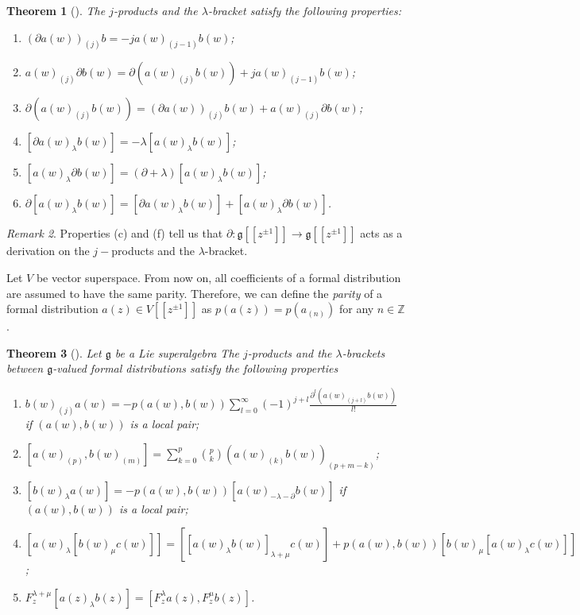 \documentclass[a4paper, 12pt, reqno]{amsart}
\newtheorem{theorem}{Theorem}[subsection]
\theoremstyle{remark}
\newtheorem{remark}[theorem]{Remark}
\numberwithin{equation}{subsection}
\begin{document}
\begin{theorem}[{\cite[Section 2.3]{nozaradan_introduction_2008}}]
  \label{thr:3}
  The $j$-products and the $\lambda$-bracket satisfy the following properties:
  \begin{enumerate}
  \item $(\partial a(w))_{(j)}b = -ja(w)_{(j - 1)}b(w)$;
  \item $a(w)_{(j)}\partial b(w) = \partial(a(w)_{(j)}b(w)) + ja(w)_{(j - 1)}b(w)$;
  \item $\partial(a(w)_{(j)}b(w))=(\partial a(w))_{(j)}b(w)+a(w)_{(j)}\partial b(w)$;
  \item $[\partial a(w)_{\lambda}b(w)] = -\lambda [a(w)_{\lambda}b(w)]$;
  \item $[a(w)_{\lambda}\partial b(w)] = (\partial + \lambda)[a(w)_{\lambda}b(w)]$;
  \item $\partial[a(w)_\lambda b(w)]=[\partial a(w)_\lambda b(w)]+[a(w)_\lambda \partial b(w)]$.
  \end{enumerate}
\end{theorem}
\begin{remark}
  \label{rmk:3}
  Properties (c) and (f) tell us that $\partial: \mathfrak{g}[[z^{\pm 1}]] \to \mathfrak{g}[[z^{\pm 1}]]$ acts as a derivation on the $j-$products and the $\lambda$-bracket.
\end{remark}

Let $V$ be vector superspace.
From now on, all coefficients of a formal distribution are assumed to have the same parity.
Therefore, we can define the \emph{parity} of a formal distribution $a(z) \in V[[z^{\pm 1}]]$ as $p(a(z)) = p(a_{(n)})$ for any $n \in \mathbb{Z}$.

\begin{theorem}[{\cite[Section 2.3]{nozaradan_introduction_2008}}]
  \label{thr:4}
  Let $\mathfrak{g}$ be a Lie superalgebra
  The $j$-products and the $\lambda$-brackets between $\mathfrak{g}$-valued formal distributions satisfy the following properties
  \begin{enumerate}
  \item $b(w)_{(j)}a(w) = -p(a(w), b(w))\sum_{l = 0}^{\infty}(-1)^{j + l}\frac{\partial^l(a(w)_{(j + l)}b(w))}{l!}$ if $(a(w), b(w))$ is a local pair;
  \item $[a(w)_{(p)}, b(w)_{(m)}] = \sum_{k = 0}^p\binom{p}{k}(a(w)_{(k)}b(w))_{(p + m - k)}$;
  \item $[b(w)_{\lambda}a(w)] = -p(a(w), b(w))[a(w)_{-\lambda - \partial}b(w)]$ if $(a(w), b(w))$ is a local pair;
  \item $[a(w)_{\lambda}[b(w)_{\mu}c(w)]] = [[a(w)_{\lambda}b(w)]_{\lambda + \mu}c(w)] + p(a(w), b(w))[b(w)_{\mu}[a(w)_{\lambda}c(w)]]$;
  \item $F^{\lambda + \mu}_z[a(z)_{\lambda}b(z)] = [F^{\lambda}_za(z), F^{\mu}_zb(z)]$.
  \end{enumerate}
\end{theorem}
\end{document}
